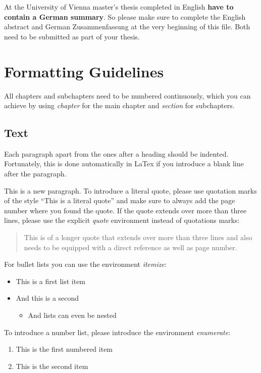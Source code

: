 \documentclass[a4paper,fontsize=12pt,listof=totoc,bibliography=totoc]{scrbook}
\begin{document}
At the University of Vienna master's thesis completed in English \textbf{have to contain a German summary}. So please make sure to complete the English abstract and German Zusammenfassung at the very beginning of this file. Both need to be submitted as part of your thesis. 


\chapter{Formatting Guidelines}
All chapters and subchapters need to be numbered continuously, which you can achieve by using \textit{chapter} for the main chapter and \textit{section} for subchapters. 

\section{Text}
Each paragraph apart from the ones after a heading should be indented. Fortunately, this is done automatically in LaTex if you introduce a blank line after the paragraph. 

This is a new paragraph. To introduce a literal quote, please use quotation marks of the style ``This is a literal quote'' \citep{lamport94} and make sure to always add the page number where you found the quote. If the quote extends over more than three lines, please use the explicit \textit{quote} environment instead of quotations marks: 

\begin{quote}
This is of a longer quote that extends over more than three lines and also needs to be equipped with a direct reference as well as page number. \citep[][8]{Goodfellow-et-al-2016}
\end{quote} 

For bullet lists you can use the environment \textit{itemize}: 
\begin{itemize}
    \item This is a first list item 
    \item And this is a second 
    \begin{itemize}
        \item And lists can even be nested
    \end{itemize}
\end{itemize}

To introduce a number list, please introduce the environment \textit{enumerate}:
\begin{enumerate}
    \item This is the first numbered item 
    \item This is the second item
\end{enumerate}
\end{document}
